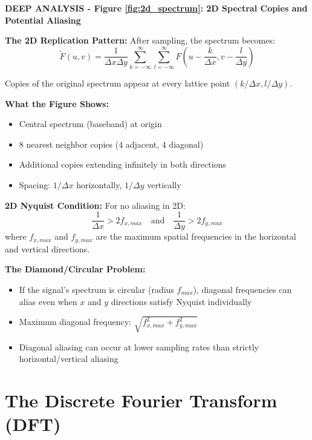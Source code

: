 \documentclass[12pt,a4paper]{article}
\begin{document}
\begin{deepexplanation}
\textbf{DEEP ANALYSIS - Figure \ref{fig:2d_spectrum}: 2D Spectral Copies and Potential Aliasing}

\textbf{The 2D Replication Pattern:}
After sampling, the spectrum becomes:
\[
\tilde{F}(u, v) = \frac{1}{\Delta x \Delta y} \sum_{k=-\infty}^{\infty} \sum_{l=-\infty}^{\infty} F\left(u - \frac{k}{\Delta x}, v - \frac{l}{\Delta y}\right)
\]

Copies of the original spectrum appear at every lattice point $(k/\Delta x, l/\Delta y)$.

\textbf{What the Figure Shows:}
\begin{itemize}
    \item Central spectrum (baseband) at origin
    \item 8 nearest neighbor copies (4 adjacent, 4 diagonal)
    \item Additional copies extending infinitely in both directions
    \item Spacing: $1/\Delta x$ horizontally, $1/\Delta y$ vertically
\end{itemize}

\textbf{2D Nyquist Condition:}
For no aliasing in 2D:
\[
\frac{1}{\Delta x} > 2 f_{x,max} \quad \text{and} \quad \frac{1}{\Delta y} > 2 f_{y,max}
\]
where $f_{x,max}$ and $f_{y,max}$ are the maximum spatial frequencies in the horizontal and vertical directions.

\textbf{The Diamond/Circular Problem:}
\begin{itemize}
    \item If the signal's spectrum is circular (radius $f_{max}$), diagonal frequencies can alias even when $x$ and $y$ directions satisfy Nyquist individually
    \item Maximum diagonal frequency: $\sqrt{f_{x,max}^2 + f_{y,max}^2}$
    \item Diagonal aliasing can occur at lower sampling rates than strictly horizontal/vertical aliasing
\end{itemize}
\end{deepexplanation}

\section{The Discrete Fourier Transform (DFT)}
\end{document}
